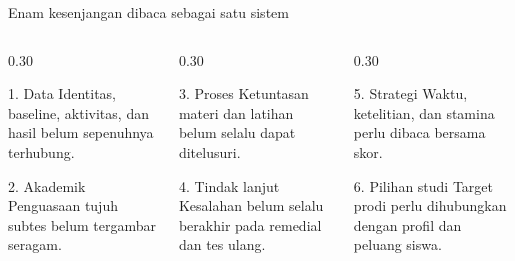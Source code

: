 \begin{frame}{Enam kesenjangan dibaca sebagai satu sistem}
  \begin{columns}[T,onlytextwidth]
    \begin{column}{0.30\textwidth}
      \begin{block}{1. Data}
        Identitas, baseline, aktivitas, dan hasil belum sepenuhnya terhubung.
      \end{block}
      \begin{block}{2. Akademik}
        Penguasaan tujuh subtes belum tergambar seragam.
      \end{block}
    \end{column}
    \begin{column}{0.30\textwidth}
      \begin{block}{3. Proses}
        Ketuntasan materi dan latihan belum selalu dapat ditelusuri.
      \end{block}
      \begin{block}{4. Tindak lanjut}
        Kesalahan belum selalu berakhir pada remedial dan tes ulang.
      \end{block}
    \end{column}
    \begin{column}{0.30\textwidth}
      \begin{block}{5. Strategi}
        Waktu, ketelitian, dan stamina perlu dibaca bersama skor.
      \end{block}
      \begin{block}{6. Pilihan studi}
        Target prodi perlu dihubungkan dengan profil dan peluang siswa.
      \end{block}
    \end{column}
  \end{columns}
\end{frame}

